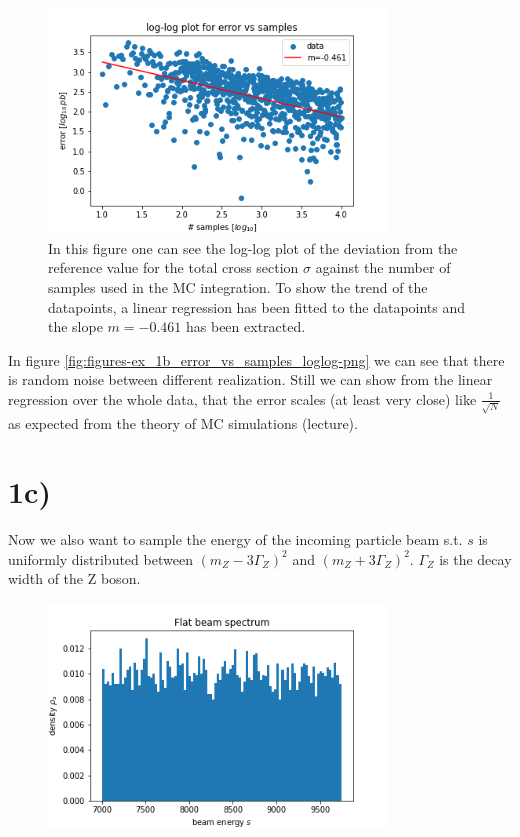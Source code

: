 \documentclass[12pt,a4paper]{scrartcl}
\begin{document}
\begin{figure}[htpb]
    \centering
    \includegraphics[width=0.8\textwidth]{figures/ex_1b_error_vs_samples_loglog.png}
    \caption{
        In this figure one can see the log-log plot of the deviation from the reference value for the total cross section $\sigma$ against the number of samples used in the MC integration.
        To show the trend of the datapoints, a linear regression has been fitted to the datapoints and the slope $m = -0.461$ has been extracted.
    }
    \label{fig:figures-ex_1b_error_vs_samples_loglog-png}
\end{figure}
        
In figure \eqref{fig:figures-ex_1b_error_vs_samples_loglog-png} we can see that there is random noise between different realization.
Still we can show from the linear regression over the whole data, that the error scales (at least very close) like $\frac{1}{\sqrt{N} }$ as expected from the theory of MC simulations (lecture).



\section*{1c)}

Now we also want to sample the energy of the incoming particle beam s.t. $s$ is uniformly distributed between $(m_Z - 3 \Gamma_Z)^2$ and $(m_Z + 3 \Gamma_Z)^2$. $\Gamma_Z$ is the decay width of the Z boson.

\begin{figure}[htpb]
    \centering
    \includegraphics[width=0.8\textwidth]{figures/ex_1c_histogram_s.png}
    \caption{}
    \label{fig:histogram_s}
\end{figure}
\end{document}
